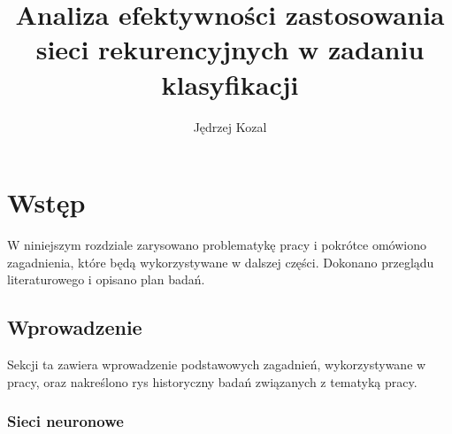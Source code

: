 \documentclass[oneside, mag]{mgr}
\title{Analiza efektywności zastosowania sieci rekurencyjnych w zadaniu klasyfikacji}
\author{Jędrzej Kozal}
\begin{document}
	

\maketitle

\tableofcontents

\chapter{Wstęp}

W niniejszym rozdziale zarysowano problematykę pracy i pokrótce omówiono zagadnienia, które będą wykorzystywane w dalszej części. Dokonano przeglądu literaturowego i opisano plan badań.

\section{Wprowadzenie}

Sekcji ta zawiera wprowadzenie podstawowych zagadnień, wykorzystywane w pracy, oraz nakreślono rys historyczny badań związanych z tematyką pracy.

\subsection{Sieci neuronowe}
\end{document}
